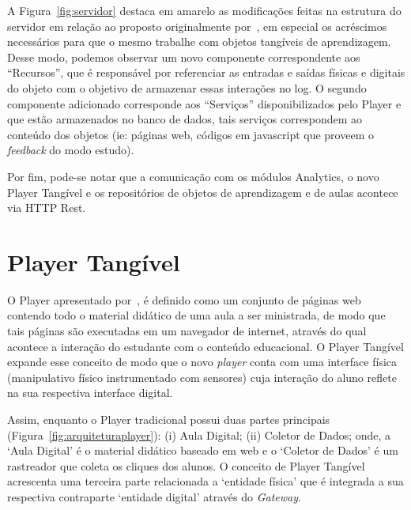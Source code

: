A Figura~\ref{fig:servidor} destaca em amarelo as modificações feitas na estrutura do servidor em relação ao proposto originalmente por~\cite{leitao:2017}, em especial os acréscimos necessários para que o mesmo trabalhe com objetos tangíveis de aprendizagem. Desse modo, podemos observar um novo componente correspondente aos  ``Recursos'', que é responsável por referenciar as entradas e saídas físicas e digitais do objeto com o objetivo de armazenar essas interações no log. O segundo componente adicionado corresponde aos ``Serviços'' disponibilizados pelo Player e que estão armazenados no banco de dados, tais serviços correspondem ao conteúdo dos objetos (ie: páginas web, códigos em javascript que proveem o \textit{feedback} do modo estudo).

Por fim, pode-se notar que a comunicação com os módulos Analytics, o novo Player Tangível e os repositórios de objetos de aprendizagem e de aulas acontece via HTTP Rest.

\section{Player Tangível}\label{section:player}


O Player apresentado por~\cite{leitao:2017}, é definido como um conjunto de páginas web contendo todo o material didático de uma aula a ser ministrada, de modo que tais páginas são executadas em um navegador de internet, através do qual acontece a interação do estudante com o conteúdo educacional. O Player Tangível expande esse conceito de modo que o novo \textit{player} conta com uma interface física (manipulativo físico instrumentado com sensores) cuja interação do aluno reflete na sua respectiva interface digital.

Assim, enquanto o Player tradicional possui duas partes principais (Figura~\ref{fig:arquiteturaplayer}): (i) Aula Digital; (ii) Coletor de Dados; onde, a `Aula Digital' é o material didático baseado em web e o `Coletor de Dados' é um rastreador que coleta os cliques dos alunos. O conceito de Player Tangível acrescenta uma terceira parte relacionada a `entidade física' que é integrada a sua respectiva contraparte `entidade digital' através do \textit{Gateway}. 

